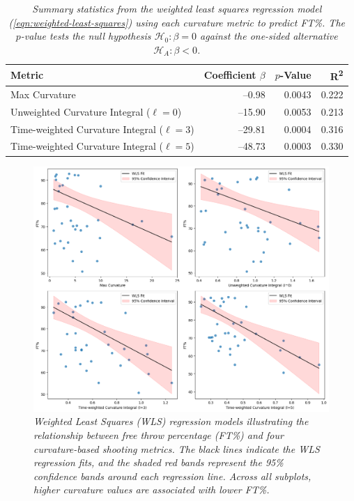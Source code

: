 \documentclass{article}
\begin{document}
    \begin{table}[H]
        \centering
        \begin{tabular}{lrrr}
        \toprule
        \textbf{Metric} & \textbf{Coefficient} $\beta$ & $p$-\textbf{Value} & \textbf{R\textsuperscript{2}}\\
        \midrule
        Max Curvature                               &   --0.98  & 0.0043  & 0.222 \\
        Unweighted Curvature Integral ($\ell=0$)    &  --15.90  & 0.0053  & 0.213 \\
        Time-weighted Curvature Integral ($\ell=3$) &  --29.81  & 0.0004  & 0.316 \\
        Time-weighted Curvature Integral ($\ell=5$) &  --48.73  & 0.0003  & 0.330 \\
        \bottomrule
        \end{tabular}
        \caption{\it Summary statistics from the weighted least squares regression model (\ref{eqn:weighted-least-squares}) using each curvature metric to predict FT\%. The $p$-value tests the null hypothesis $\mathcal{H}_0 : \beta = 0$ against the one-sided alternative $\mathcal{H}_A : \beta < 0$.}
        \label{tab:wls-results}
    \end{table}
    
    \begin{figure}[H]
        \centering
        \includegraphics[width=0.6\linewidth]{reports/arxiv/regression_updated.png}
        \caption{\it Weighted Least Squares (WLS) regression models illustrating the relationship between free throw percentage (FT\%) and four curvature-based shooting metrics. The black lines indicate the WLS regression fits, and the shaded red bands represent the 95\% confidence bands around each regression line. Across all subplots, higher curvature values are associated with lower FT\%.}
        \label{fig:regressionlines}
    \end{figure}
\end{document}
